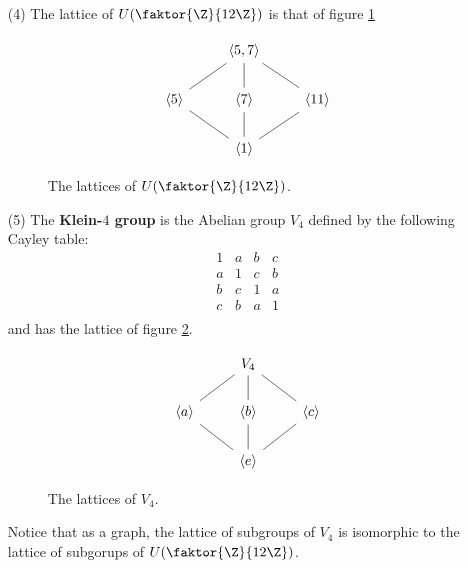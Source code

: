 \begin{example}
\begin{enumerate}
        \item[(4)] The lattice of $U(\faktor{\Z}{12\Z})$ is that of figure
            \ref{fig_2.4}
            \begin{figure}[h]
\[\begin{tikzcd}
	& {\langle 5,7 \rangle} \\
	{\langle 5 \rangle} & {\langle 7 \rangle} & {\langle 11 \rangle} \\
	& {\langle 1 \rangle}
	\arrow[no head, from=1-2, to=2-2]
	\arrow[no head, from=1-2, to=2-1]
	\arrow[no head, from=2-1, to=3-2]
	\arrow[no head, from=3-2, to=2-3]
	\arrow[no head, from=2-3, to=1-2]
	\arrow[no head, from=2-2, to=3-2]
\end{tikzcd}\]
                \caption{The lattices of $U(\faktor{\Z}{12\Z})$.}
                \label{fig_2.4}
            \end{figure}

        \item[(5)] The \textbf{Klein-$4$ group} is the Abelian group $V_4$
            defined by the following Cayley table:
            \begin{equation*}
                \begin{matrix}
                    1 & a & b & c \\
                    a & 1 & c & b \\
                    b & c & 1 & a \\
                    c & b & a & 1 \\
                \end{matrix}
            \end{equation*}
            and has the lattice of figure \ref{fig_2.5}.
            \begin{figure}[h]
\[\begin{tikzcd}
	& {V_4} \\
	{\langle a \rangle} & {\langle b \rangle} & {\langle c \rangle} \\
	& {\langle e \rangle}
	\arrow[no head, from=1-2, to=2-2]
	\arrow[no head, from=1-2, to=2-1]
	\arrow[no head, from=2-1, to=3-2]
	\arrow[no head, from=3-2, to=2-3]
	\arrow[no head, from=2-3, to=1-2]
	\arrow[no head, from=2-2, to=3-2]
\end{tikzcd}\]
                \caption{The lattices of $V_4$.}
                \label{fig_2.5}
            \end{figure}
            Notice that as a graph, the lattice of subgroups of $V_4$ is
            isomorphic to the lattice of subgorups of $U(\faktor{\Z}{12\Z})$.
    \end{enumerate}
\end{example}

